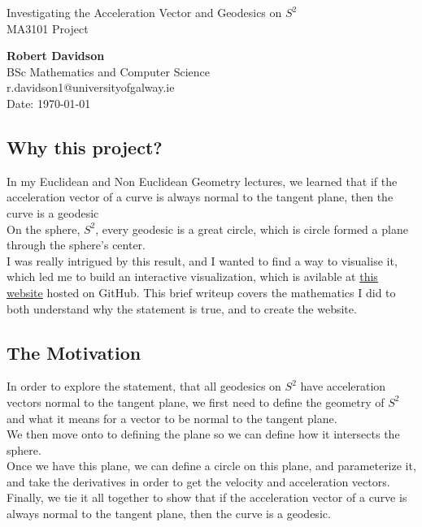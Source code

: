 \documentclass[11pt]{article}
\begin{document}
\begin{center}
    \vspace{0.5cm}
    Investigating the Acceleration Vector and Geodesics on $S^2$\\
    MA3101 Project\\[24pt]
    \LARGE

    \Large
    \textbf{Robert Davidson}\\[6pt]
    \small
    BSc Mathematics and Computer Science \\ r.davidson1@universityofgalway.ie\\[6pt]
    Date: \today\\[12pt]
\end{center}

\vspace{1.5cm}

\subsection*{Why this project?}
In my Euclidean and Non Euclidean Geometry lectures, we learned that if the acceleration vector of a curve is always normal to the tangent plane, then the curve is a geodesic\\[0.5ex]
On the sphere, $S^2$, every geodesic is a great circle, which is circle formed a plane through the sphere's center. \\[0.5ex]
I was really intrigued by this result, and I wanted to find a way to visualise it, which led me to build an interactive visualization, which is avilable at \href{https://robertdavidson1.github.io/MA3101Project/}{this website} hosted on GitHub.
This brief writeup covers the mathematics I did to both understand why the statement is true, and to create the website.

\subsection*{The Motivation}
In order to explore the statement, that all geodesics on $S^2$ have acceleration vectors normal to the tangent plane, we first need to define the geometry of $S^2$ and what it means for a vector to be normal to the tangent plane. \\[0.5ex] We then move onto to defining the plane so we can define how it intersects the sphere. \\[0.5ex]
Once we have this plane, we can define a circle on this plane, and parameterize it, and take the derivatives in order to get the velocity and acceleration vectors. \\[0.5ex]
Finally, we tie it all together to show that if the acceleration vector of a curve is always normal to the tangent plane, then the curve is a geodesic.
\end{document}
